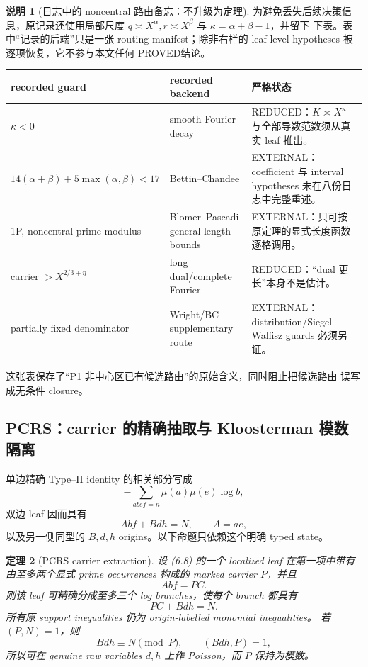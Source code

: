 \documentclass[11pt,a4paper]{ctexart}
\newtheorem{theorem}{定理}[section]
\theoremstyle{definition}
\newtheorem{remark}[theorem]{说明}
\newcommand{\1}{\mathbf 1}
\newcommand{\REDUCED}{\textcolor{orange!80!black}{\textsf{REDUCED}}}
\newcommand{\PROVED}{\textcolor{green!45!black}{\textsf{PROVED}}}
\newcommand{\EXTERNAL}{\textcolor{blue!70!black}{\textsf{EXTERNAL}}}
\begin{document}
\begin{remark}[日志中的 noncentral 路由备忘：不升级为定理]
为避免丢失后续决策信息，原记录还使用局部尺度
$q\asymp X^\alpha,r\asymp X^\beta$ 与 $\kappa=\alpha+\beta-1$，并留下
下表。表中“记录的后端”只是一张 routing manifest；除非右栏的 leaf-level
hypotheses 被逐项恢复，它不参与本文任何 \PROVED 结论。
\begin{center}
\begin{tabular}{p{}p{}p{}}
\toprule
recorded guard & recorded backend & 严格状态\\
\midrule
$\kappa<0$ & smooth Fourier decay
& \REDUCED：$K\asymp X^\kappa$ 与全部导数范数须从真实 leaf 推出。\\
$14(\alpha+\beta)+5\max(\alpha,\beta)<17$
& Bettin--Chandee
& \EXTERNAL：coefficient 与 interval hypotheses 未在八份日志中完整重述。\\
1P, noncentral prime modulus
& Blomer--Pascadi general-length bounds
& \EXTERNAL：只可按原定理的显式长度函数逐格调用。\\
carrier $>X^{2/3+\eta}$
& long dual/complete Fourier
& \REDUCED：“dual 更长”本身不是估计。\\
partially fixed denominator
& Wright/BC supplementary route
& \EXTERNAL：distribution/Siegel--Walfisz guards 必须另证。\\
\bottomrule
\end{tabular}
\end{center}
这张表保存了“P1 非中心区已有候选路由”的原始含义，同时阻止把候选路由
误写成无条件 closure。
\end{remark}

\subsection{PCRS：carrier 的精确抽取与 Kloosterman 模数隔离}

单边精确 Type--II identity 的相关部分写成
\[
-\!\sum_{abef=n}\mu(a)\mu(e)\log b,                  \tag{6.7}
\]
双边 leaf 因而具有
\[
A b f+B d h=N,\qquad A=ae,                            \tag{6.8}
\]
以及另一侧同型的 $B,d,h$ origins。以下命题只依赖这个明确 typed state。

\begin{theorem}[PCRS carrier extraction]\label{thm:pcrs}
设 (6.8) 的一个 localized leaf 在第一项中带有由至多两个显式 prime
occurrences 构成的 marked carrier $P$，并且
\[
A b f=P C.                                             \tag{6.9}
\]
则该 leaf 可精确分成至多三个 log branches，使每个 branch 都具有
\[
\boxed{P C+Bdh=N}.                                    \tag{6.10}
\]
所有原 support inequalities 仍为 origin-labelled monomial inequalities。
若 $(P,N)=1$，则
\[
Bdh\equiv N\pmod P,\qquad (Bdh,P)=1,                 \tag{6.11}
\]
所以可在 genuine raw variables $d,h$ 上作 Poisson，而 $P$ 保持为模数。
\end{theorem}
\end{document}
